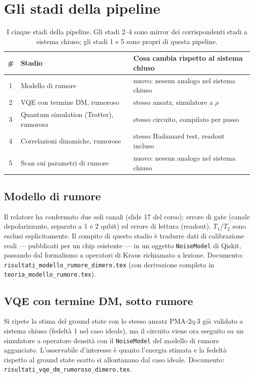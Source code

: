 \documentclass[11pt,a4paper]{article}
\begin{document}
\section{Gli stadi della pipeline}
\label{sec:stadi}

\begin{table}[htbp]
\centering
\begin{tabular}{@{}cll@{}}
\toprule
\# & Stadio & Cosa cambia rispetto al sistema chiuso \\
\midrule
1 & Modello di rumore & nuovo: nessun analogo nel sistema chiuso \\
2 & VQE con termine DM, rumoroso & stesso ansatz, simulatore a $\rho$ \\
3 & Quantum simulation (Trotter), rumorosa & stesso circuito, compilato per passo \\
4 & Correlazioni dinamiche, rumorose & stesso Hadamard test, readout incluso \\
5 & Scan sui parametri di rumore & nuovo: nessun analogo nel sistema chiuso \\
\bottomrule
\end{tabular}
\caption{I cinque stadi della pipeline. Gli stadi 2--4 sono mirror dei
corrispondenti stadi a sistema chiuso; gli stadi 1 e 5 sono propri di
questa pipeline.}
\end{table}
\FloatBarrier

\subsection{Modello di rumore}

Il relatore ha confermato due soli canali (slide 17 del corso): errore
di gate (canale depolarizzante, separato a 1 e 2 qubit) ed errore di
lettura (readout). $T_1$/$T_2$ sono esclusi esplicitamente. Il compito
di questo stadio è tradurre dati di calibrazione reali --- pubblicati
per un chip esistente --- in un oggetto \texttt{NoiseModel} di Qiskit,
passando dal formalismo a operatori di Kraus richiamato a lezione.
Documento: \texttt{risultati\_modello\_rumore\_dimero.tex} (con
derivazione completa in \texttt{teoria\_modello\_rumore.tex}).

\subsection{VQE con termine DM, sotto rumore}

Si ripete la stima del ground state con lo stesso ansatz PMA-2q$\cdot$3
già validato a sistema chiuso (fedeltà 1 nel caso ideale), ma il
circuito viene ora eseguito su un simulatore a operatore densità con il
\texttt{NoiseModel} del modello di rumore agganciato. L'osservabile
d'interesse è quanto l'energia stimata e la fedeltà rispetto al ground
state esatto si allontanano dal caso ideale. Documento:
\texttt{risultati\_vqe\_dm\_rumoroso\_dimero.tex}.
\end{document}
